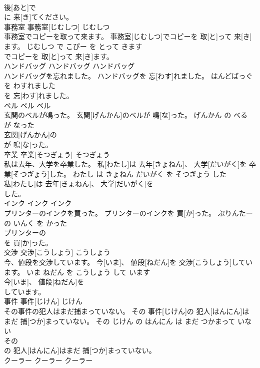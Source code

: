 \documentclass[8pt]{extreport}
\begin{document}
\begin{CJK}{UTF8}{min}
\\	後[あと]で
\\	に 来[き]てください。			
\\	事務室	事務室[じむしつ]	じむしつ	
\\	事務室でコピーを取って来ます。	事務室[じむしつ]でコピーを 取[と]って 来[き]ます。	じむしつ で こぴー を とって きます	
\\	でコピーを 取[と]って 来[き]ます。			
\\	ハンドバッグ	ハンドバッグ	ハンドバッグ	
\\	ハンドバッグを忘れました。	ハンドバッグを 忘[わす]れました。	はんどばっぐ を わすれました	
\\	を 忘[わす]れました。			
\\	ベル	ベル	ベル	
\\	玄関のベルが鳴った。	玄関[げんかん]のベルが 鳴[な]った。	げんかん の べる が なった	
\\	玄関[げんかん]の
\\	が 鳴[な]った。			
\\	卒業	卒業[そつぎょう]	そつぎょう	
\\	私は去年、大学を卒業した。	私[わたし]は 去年[きょねん]、 大学[だいがく]を 卒業[そつぎょう]した。	わたし は きょねん だいがく を そつぎょう した	
\\	私[わたし]は 去年[きょねん]、 大学[だいがく]を
\\	した。			
\\	インク	インク	インク	
\\	プリンターのインクを買った。	プリンターのインクを 買[か]った。	ぷりんたー の いんく を かった	
\\	プリンターの
\\	を 買[か]った。			
\\	交渉	交渉[こうしょう]	こうしょう	
\\	今、値段を交渉しています。	今[いま]、 値段[ねだん]を 交渉[こうしょう]しています。	いま ねだん を こうしょう して います	
\\	今[いま]、 値段[ねだん]を
\\	しています。			
\\	事件	事件[じけん]	じけん	
\\	その事件の犯人はまだ捕まっていない。	その 事件[じけん]の 犯人[はんにん]はまだ 捕[つか]まっていない。	その じけん の はんにん は まだ つかまって いない	
\\	その
\\	の 犯人[はんにん]はまだ 捕[つか]まっていない。			
\\	クーラー	クーラー	クーラー	

\end{CJK}
\end{document}

